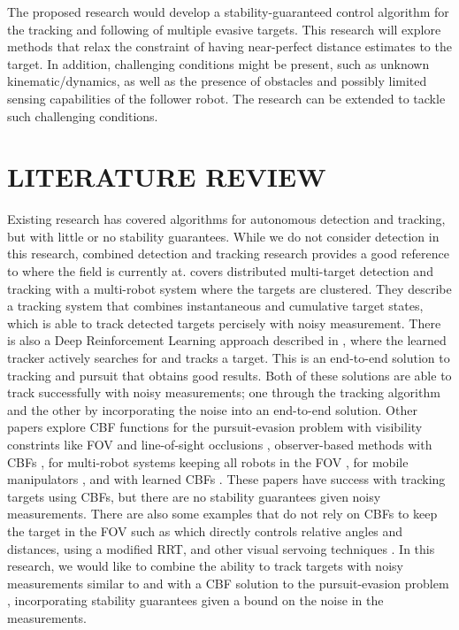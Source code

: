 \documentclass[letterpaper, 10 pt, conference]{ieeeconf}
\begin{document}
The proposed research would develop a stability-guaranteed control algorithm for the tracking and following of multiple evasive targets. This research will explore methods that relax the constraint of having near-perfect distance estimates to the target. In addition, challenging conditions might be present, such as unknown kinematic/dynamics, as well as the presence of obstacles and possibly limited sensing capabilities of the follower robot. The research can be extended to tackle
such challenging conditions.

\section{LITERATURE REVIEW}

Existing research has covered algorithms for autonomous detection and tracking, but with little or no stability guarantees. While we do not consider detection in this research, combined detection and tracking research provides a good reference to where the field is currently at. \cite{multi_target_clustered} covers distributed multi-target detection and tracking with a multi-robot system where the targets are clustered. They describe a tracking system that combines instantaneous and cumulative target states, which is able to track detected targets percisely with noisy measurement. There is also a Deep Reinforcement Learning approach described in \cite{reinforcement_learning}, where the learned tracker actively searches for and tracks a target. This is an end-to-end solution to tracking and pursuit that obtains good results. Both of these solutions are able to track successfully with noisy measurements; one through the tracking algorithm and the other by incorporating the noise into an end-to-end solution. Other papers explore CBF functions for the pursuit-evasion problem with visibility constrints like FOV and line-of-sight occlusions \cite{fov_line_of_sight_paper}, observer-based methods with CBFs \cite{observer_based_paper}, for multi-robot systems keeping all robots in the FOV \cite{multi_robot_paper}, for mobile manipulators \cite{mobile_manipulator_paper}, and with learned CBFs \cite{learned_cbf_paper}. These papers have success with tracking targets using CBFs, but there are no stability guarantees given noisy measurements. There are also some examples that do not rely on CBFs to keep the target in the FOV such as \cite{direct_control_paper} which directly controls relative angles and distances, \cite{rrt_paper} using a modified RRT, and other visual servoing techniques \cite{visual_servo_paper}. In this research, we would like to combine the ability to track targets with noisy measurements similar to \cite{multi_target_clustered} and \cite{reinforcement_learning} with a CBF solution to the pursuit-evasion problem \cite{fov_line_of_sight_paper} \cite{observer_based_paper} \cite{multi_robot_paper} \cite{mobile_manipulator_paper} \cite{learned_cbf_paper}, incorporating stability guarantees given a bound on the noise in the measurements.
\end{document}
